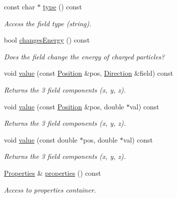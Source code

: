 \begin{DoxyCompactItemize}
const char $\ast$ \hyperlink{class_d_d4hep_1_1_geometry_1_1_cartesian_field_a9d06918823238356e8a1786391af78cc}{type} () const 
\begin{DoxyCompactList}\small\item\em Access the field type (string). \item\end{DoxyCompactList}\item 
bool \hyperlink{class_d_d4hep_1_1_geometry_1_1_cartesian_field_ae90a6c790ecc560abf0d44a59f2e9364}{changesEnergy} () const 
\begin{DoxyCompactList}\small\item\em Does the field change the energy of charged particles? \item\end{DoxyCompactList}\item 
void \hyperlink{class_d_d4hep_1_1_geometry_1_1_cartesian_field_a124dcb501e72381b6c5aacfd5382822b}{value} (const \hyperlink{namespace_d_d4hep_1_1_geometry_a55083902099d03506c6db01b80404900}{Position} \&pos, \hyperlink{namespace_d_d4hep_1_1_geometry_a56730a0ddb9f3f089c415cd693bd7c19}{Direction} \&field) const 
\begin{DoxyCompactList}\small\item\em Returns the 3 field components (x, y, z). \item\end{DoxyCompactList}\item 
void \hyperlink{class_d_d4hep_1_1_geometry_1_1_cartesian_field_a21a1a039c5a742fb3f62932059f7d1a7}{value} (const \hyperlink{namespace_d_d4hep_1_1_geometry_a55083902099d03506c6db01b80404900}{Position} \&pos, double $\ast$val) const 
\begin{DoxyCompactList}\small\item\em Returns the 3 field components (x, y, z). \item\end{DoxyCompactList}\item 
void \hyperlink{class_d_d4hep_1_1_geometry_1_1_cartesian_field_afb9f7d4d28e90f2e341e8272c718c604}{value} (const double $\ast$pos, double $\ast$val) const 
\begin{DoxyCompactList}\small\item\em Returns the 3 field components (x, y, z). \item\end{DoxyCompactList}\item 
\hyperlink{class_d_d4hep_1_1_geometry_1_1_cartesian_field_a37a636b9f5ee9ead172cca958dacb920}{Properties} \& \hyperlink{class_d_d4hep_1_1_geometry_1_1_cartesian_field_ac6bf85a9043a7c08f84ce30afacc4b61}{properties} () const 
\begin{DoxyCompactList}\small\item\em Access to properties container. \item\end{DoxyCompactList}\end{DoxyCompactItemize}


